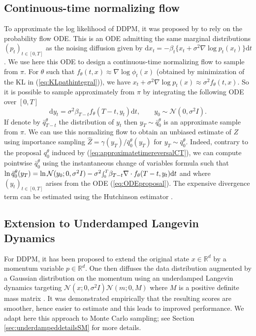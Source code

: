 \documentclass{article} %
\begin{document}
\subsection{Continuous-time normalizing flow}\label{sec:CTNF}
To approximate the log likelihood of DDPM, it was proposed by \cite{song2020score} to rely on the probability flow ODE. This is an ODE admitting the same marginal distributions $(p_t)_{t\in[0,T]}$ as the noising diffusion given by $\mathrm{d}x_t=-\beta_t \big\{ x_t + \sigma^2 \nabla \log p_t(x_t)\big\}\mathrm{d}t$. We use here this ODE to design a continuous-time normalizing flow to sample from $\pi$. For $\theta$ such that $f_{\theta}(t,x) \approx \nabla \log \phi_t(x)$ (obtained by minimization of the KL in (\ref{eq:KLpathintegral})), we have $x_t+ \sigma^2 \nabla \log p_t(x) \approx \sigma^2 f_{\theta}(t,x)$. So it is possible to sample approximately from $\pi$ by integrating the following ODE over $[0,T]$
\begin{equation}\label{eq:ODEproposal}
   \mathrm{d}y_t=\sigma^2 \beta_{T-t} f_{\theta}(T-t,y_t) \mathrm{d}t,\qquad y_0\sim  \mathcal{N}(0,\sigma^2 I).
\end{equation}
If denote by $\bar{q}^{\theta}_{T-t}$ the distribution of $y_t$ then $y_T \sim \bar{q}^{\theta}_{0}$ is an approximate sample from $\pi$. We can use this normalizing flow to obtain an unbiased estimate of $Z$ using importance sampling $\hat{Z}=\gamma(y_{T})/\bar{q}^{\theta}_{0}(y_T)$ for $y_T\sim \bar{q}^{\theta}_{0}$.
Indeed, contrary to the proposal $q^{\theta}_0$ induced by (\ref{eq:approximatetimereversalCT}), we can compute pointwise $\bar{q}^{\theta}_{0}$ using the instantaneous change of variables formula \citep{chen2018neural} such that $\log \bar{q}^{\theta}_0(y_T) = \log \mathcal{N}(y_0;0,\sigma^2 I)-\sigma^2 \scaleobj{.8}{\int^T_0} \beta_{T-t} \nabla \cdot f_{\theta}(T-t,y_t) \mathrm{d}t$ and where $(y_t)_{t\in [0,T]}$ arises from the ODE (\ref{eq:ODEproposal}). 
The expensive divergence term can be estimated using the Hutchinson estimator \citep{grathwohl2018ffjord,song2020score}.

\subsection{Extension to Underdamped Langevin Dynamics}\label{subsec:underdampedLangevin}
For DDPM, it has been proposed to extend the original state $x \in \mathbb{R}^d$ by a momentum variable $p \in \mathbb{R}^d$. One then diffuses the data distribution augmented by a Gaussian distribution on the momentum using an underdamped Langevin dynamics targeting $\mathcal{N}(x;0,\sigma^2I)\mathcal{N}(m;0,M)$ where $M$ is a positive definite mass matrix \citep{Dockhorn2022}. It was demonstrated empirically that the resulting scores are smoother, hence easier to estimate and this leads to improved performance. We adapt here this approach to Monte Carlo sampling; see Section \ref{sec:underdampeddetailsSM} for more details.
\end{document}
